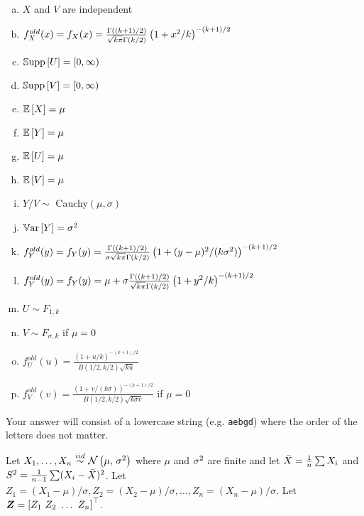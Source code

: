\documentclass[12pt,landscape]{article}
\newcommand{\instr}{\small Your answer will consist of a lowercase string (e.g. \texttt{aebgd}) where the order of the letters does not matter. \normalsize}
\begin{document}
\vspace{-0.2cm}\benum{} 

\begin{enumerate}[(a)]
\item $X$ and $V$ are independent
\item $f^{old}_X(x) = f_X(x) = \frac{\Gamma\left((k+1) / 2\right)}{\sqrt{k\pi} \Gamma\left(k/2\right)} \left(1 + x^2 / k\right)^{-(k+1) / 2}$
\item $\mathbb{S}\text{upp}\left[U\right] = [0, \infty)$
\item $\mathbb{S}\text{upp}\left[V\right] = [0, \infty)$
\item $\mathbb{E}\left[X\right] = \mu$
\item $\mathbb{E}\left[Y\right] = \mu$
\item $\mathbb{E}\left[U\right] = \mu$
\item $\mathbb{E}\left[V\right] = \mu$
\item $Y / V \sim $ Cauchy$(\mu,\sigma)$
\item $\mathbb{V}\text{ar}\left[Y\right] = \sigma^2$
\item $f^{old}_Y(y) = f_Y(y) = \frac{\Gamma\left((k+1) / 2\right)}{\sigma\sqrt{k\pi} \Gamma\left(k/2\right)} \left(1 + (y - \mu)^2 / (k\sigma^2)\right)^{-(k+1) / 2}$
\item $f^{old}_Y(y) = f_Y(y) = \mu + \sigma  \frac{\Gamma\left((k+1) / 2\right)}{\sqrt{k\pi} \Gamma\left(k/2\right)} \left(1 + y^2 / k\right)^{-(k+1) / 2}$
\item $U \sim F_{1,k}$
\item $V \sim F_{\sigma,k}$ if $\mu=0$
\item $f^{old}_U(u) = \frac{(1 + u / k)^{-(k+1) / 2}}{B(1/2, k/2) \sqrt{ku} }$
\item $f^{old}_V(v) = \frac{(1 + v / (k\sigma))^{-(k+1) / 2}}{B(1/2, k/2) \sqrt{k\sigma v}}$ if $\mu=0$
\end{enumerate}
\eenum\instr\pagebreak


\problem{} Let $\Xoneton \iid \normnot{\mu}{\sigsq}$ where $\mu$ and $\sigma^2$ are finite and let $\bar{X} = \frac{1}{n} \sum X_i$ and $S^2 = \frac{1}{n - 1} \sum (X_i - \bar{X})^2$. Let $Z_1 = (X_1 - \mu)/\sigma, Z_2 = (X_2 - \mu)/\sigma,\ldots, Z_n = (X_n - \mu)/\sigma$. Let $\boldsymbol{Z} = \left[Z_1~Z_2 ~\ldots~ Z_n\right]^\top$.

\vspace{-0.2cm}\benum{} 
\end{document}
